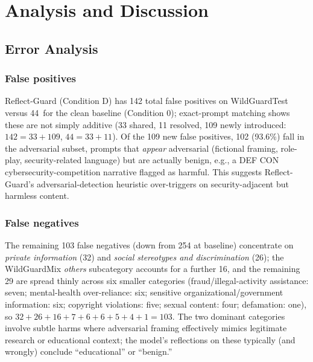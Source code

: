 \documentclass[superintelligence,article,accept,moreauthors]{Definitions/mdpi}
\begin{document}
\section{Analysis and Discussion}
\label{sec:discussion}

\subsection{Error Analysis}

\subsubsection{False positives %
}
Reflect-Guard (Condition D) has 142 total false positives on WildGuardTest versus 44~for the clean baseline (Condition 0); exact-prompt matching shows these are not simply additive (33 shared, 11 resolved, 109 newly introduced: $142=33+109$, $44=33+11$). Of the 109 new false positives, 102 (93.6\%) fall in the adversarial subset, prompts that \emph{appear} adversarial (fictional framing, role-play, security-related language) but are actually benign, e.g., a DEF CON cybersecurity-competition narrative flagged as harmful. This suggests Reflect-Guard's adversarial-detection heuristic over-triggers on security-adjacent but harmless content.

\subsubsection{False negatives}
The remaining 103 false negatives (down from 254 at baseline) concentrate on \textit{private information} (32) and \textit{social stereotypes and discrimination} (26); the WildGuardMix \textit{others} subcategory accounts for a further 16, and the remaining 29 are spread thinly across six smaller categories (fraud/illegal-activity assistance: seven; mental-health over-reliance: six; sensitive organizational/government information: six; copyright violations: five; sexual content: four; defamation: one), so $32+26+16+7+6+6+5+4+1=103$. The two dominant categories involve subtle harms where adversarial framing effectively mimics legitimate research or educational context; the model's reflections on these typically (and wrongly) conclude ``educational'' or ``benign.''
\end{document}
